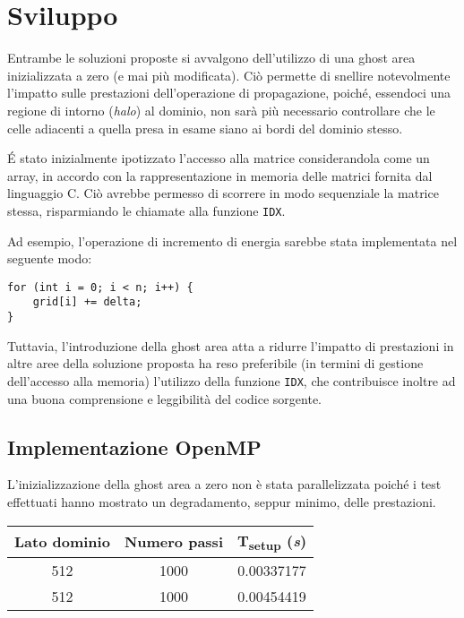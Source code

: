\section{Sviluppo}

Entrambe le soluzioni proposte si avvalgono dell'utilizzo di una ghost area
inizializzata a zero (e mai più modificata).
Ciò permette di snellire notevolmente l'impatto sulle prestazioni
dell'operazione di propagazione, poiché, essendoci una regione di intorno
(\textit{halo}) al dominio, non sarà più necessario controllare che le celle
adiacenti a quella presa in esame siano ai bordi del dominio stesso.

É stato inizialmente ipotizzato l'accesso alla matrice considerandola come un
array, in accordo con la rappresentazione in memoria delle matrici fornita dal
linguaggio C.
Ciò avrebbe permesso di scorrere in modo sequenziale la matrice stessa,
risparmiando le chiamate alla funzione \texttt{IDX}.

Ad esempio, l'operazione di incremento di energia sarebbe stata implementata nel
seguente modo:
\begin{verbatim}
for (int i = 0; i < n; i++) {
    grid[i] += delta;
}
\end{verbatim}

Tuttavia, l'introduzione della ghost area atta a ridurre l'impatto di
prestazioni in altre aree della soluzione proposta ha reso preferibile (in
termini di gestione dell'accesso alla memoria) l'utilizzo della funzione
\texttt{IDX}, che contribuisce inoltre ad una buona comprensione e leggibilità
del codice sorgente.

\subsection{Implementazione OpenMP}

L'inizializzazione della ghost area a zero non è stata parallelizzata poiché i
test effettuati hanno mostrato un degradamento, seppur minimo, delle
prestazioni.

\begin{center}
\begin{tabular}{ccc}
 \hline
 Lato dominio & Numero passi & T\textsubscript{setup} (\textit{s})\\
 \hline
 512 & 1000 & 0.00337177\\
 512 & 1000 & 0.00454419\\
 \hline
\end{tabular}
\end{center}

